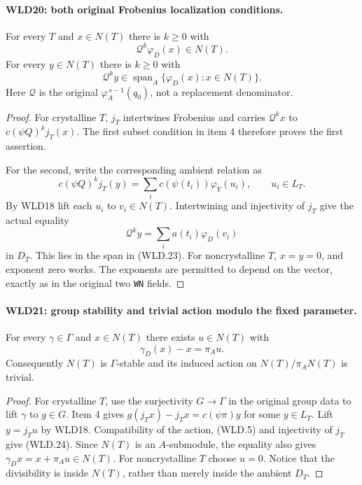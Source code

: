 \paragraph{WLD20: both original Frobenius localization conditions.}
\label{claim:WLD20}
For every $T$ and $x\in N(T)$ there is $k\ge0$ with
\[
                   \mathcal Q^k\varphi_D(x)\in N(T).
\]
For every $y\in N(T)$ there is $k\ge0$ with
\[
           \mathcal Q^ky\in
                  \operatorname{span}_A\{\varphi_D(x):x\in N(T)\}.
                                                               \tag{WLD.23}
\]
Here $\mathcal Q$ is the original
$\varphi_A^{\,s-1}(q_0)$, not a replacement denominator.

\begin{proof}
For crystalline $T$, $j_T$ intertwines Frobenius and carries
$\mathcal Q^kx$ to $c(\psi Q)^kj_T(x)$. The first subset
condition in item 4 therefore proves the first assertion.

For the second, write the corresponding ambient relation as
\[
 c(\psi Q)^kj_T(y)=
                 \sum_i c(\psi(t_i))\varphi_Y(u_i),
                         \qquad u_i\in L_T.
\]
By WLD18 lift each $u_i$ to $v_i\in N(T)$. Intertwining and
injectivity of $j_T$ give the actual equality
\[
                      \mathcal Q^ky=\sum_i a(t_i)\varphi_D(v_i)
\]
in $D_T$. This lies in the span in (WLD.23).
For noncrystalline $T$, $x=y=0$, and exponent zero works.
The exponents are permitted to depend on the vector, exactly
as in the original two \texttt{WN} fields.
\end{proof}

\paragraph{WLD21: group stability and trivial action modulo the fixed parameter.}
\label{claim:WLD21}
For every $\gamma\in\Gamma$ and $x\in N(T)$ there exists
$u\in N(T)$ with
\[
                        \gamma_D(x)-x=\pi_Au.             \tag{WLD.24}
\]
Consequently $N(T)$ is $\Gamma$-stable and its induced action
on $N(T)/\pi_A N(T)$ is trivial.

\begin{proof}
For crystalline $T$, use the surjectivity $G\to\Gamma$ in the
original group data to lift $\gamma$ to $g\in G$. Item 4 gives
$g(j_Tx)-j_Tx=c(\psi\pi)y$ for some $y\in L_T$.
Lift $y=j_Tu$ by WLD18. Compatibility of the action, (WLD.5)
and injectivity of $j_T$ give (WLD.24).
Since $N(T)$ is an $A$-submodule, the equality also gives
$\gamma_Dx=x+\pi_Au\in N(T)$.
For noncrystalline $T$ choose $u=0$. Notice that the divisibility
is inside $N(T)$, rather than merely inside the ambient $D_T$.
\end{proof}

